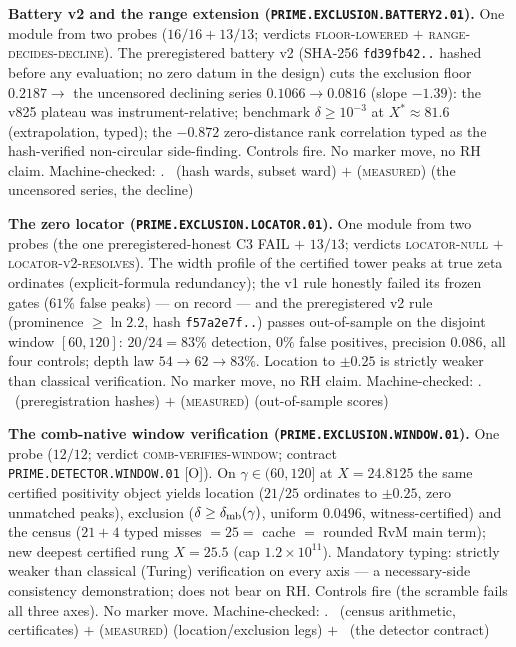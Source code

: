 \documentclass[11pt,a4paper]{article}
\theoremstyle{definition}
\begin{document}
\par\smallskip\noindent\textbf{Battery v2 and the range extension
(\texttt{PRIME.EXCLUSION.BATTERY2.01}).}
One module from two probes ($16/16 + 13/13$; verdicts
\textsc{floor-lowered} $+$ \textsc{range-decides-decline}).  The
preregistered battery v2 (SHA-256 \texttt{fd39fb42..} hashed
before any evaluation; no zero datum in the design) cuts the
exclusion floor $0.2187 \to$ the uncensored declining series
$0.1066 \to 0.0816$ (slope $-1.39$): the v825 plateau was
instrument-relative; benchmark $\delta \ge 10^{-3}$ at
$X^* \approx 81.6$ (extrapolation, typed); the $-0.872$
zero-distance rank correlation typed as the hash-verified
non-circular side-finding.  Controls fire.  No marker move, no
RH claim.
Machine-checked: .
\mE\ (hash wards, subset ward) $+$ (\textsc{measured}) (the
uncensored series, the decline)
\par\smallskip

\par\smallskip\noindent\textbf{The zero locator
(\texttt{PRIME.EXCLUSION.LOCATOR.01}).}
One module from two probes (the one preregistered-honest C3 FAIL
$+$ $13/13$; verdicts \textsc{locator-null} $+$
\textsc{locator-v2-resolves}).  The width profile of the
certified tower peaks at true zeta ordinates
(explicit-formula redundancy); the v1 rule honestly failed its
frozen gates ($61\%$ false peaks) --- on record --- and the
preregistered v2 rule (prominence $\ge \ln 2.2$, hash
\texttt{f57a2e7f..}) passes out-of-sample on the disjoint window
$[60, 120]$: $20/24 = 83\%$ detection, $0\%$ false positives,
precision $0.086$, all four controls; depth law
$54 \to 62 \to 83\%$.  Location to $\pm 0.25$ is strictly weaker
than classical verification.  No marker move, no RH claim.
Machine-checked: .
\mE\ (preregistration hashes) $+$ (\textsc{measured})
(out-of-sample scores)
\par\smallskip

\par\smallskip\noindent\textbf{The comb-native window
verification (\texttt{PRIME.EXCLUSION.WINDOW.01}).}
One probe ($12/12$; verdict \textsc{comb-verifies-window};
contract \texttt{PRIME.DETECTOR.WINDOW.01} [O]).  On
$\gamma \in (60, 120]$ at $X = 24.8125$ the same certified
positivity object yields location ($21/25$ ordinates to
$\pm 0.25$, zero unmatched peaks), exclusion ($\delta \ge
\delta_{\rm mb}(\gamma)$, uniform $0.0496$, witness-certified)
and the census ($21 + 4$ typed misses $= 25 =$ cache $=$ rounded
RvM main term); new deepest certified rung $X = 25.5$ (cap
$1.2\times10^{11}$).  Mandatory typing: strictly weaker than
classical (Turing) verification on every axis --- a
necessary-side consistency demonstration; does not bear on RH.
Controls fire (the scramble fails all three axes).  No marker
move.
Machine-checked: .
\mE\ (census arithmetic, certificates) $+$ (\textsc{measured})
(location/exclusion legs) $+$ \mO\ (the detector contract)
\par\smallskip
\end{document}
